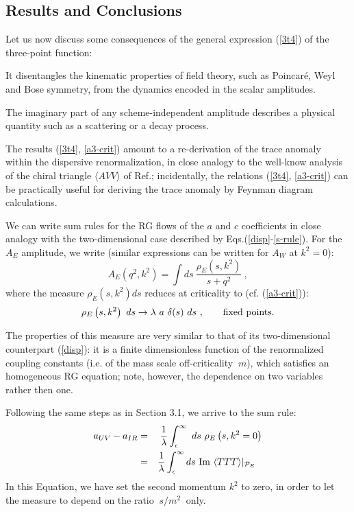 \documentclass[proceedings]{JHEP}
\newcommand{\beq}{\begin{equation}}
\newcommand{\eeq}{\end{equation}}
\newcommand{\bea}{\begin{eqnarray}}
\newcommand{\eea}{\end{eqnarray}}
\def\d{\delta}
\def\eps{\epsilon}
\def\l{\lambda}
\def\r{\rho}
\def\Im{\hbox{\rm Im\ }}
\def\nl{\nonumber\\}
\def\bra{\langle}
\def\ket{\rangle}
\def\TTT{\bra TTT\ket}
\begin{document}

\subsection{Results and Conclusions}

Let us now discuss some consequences 
of the general expression (\ref{3t4}) of the three-point function: 

It disentangles the kinematic properties of field theory, 
such as Poincar\'e, Weyl and Bose symmetry, from the dynamics 
encoded in the scalar amplitudes.

The imaginary part of any scheme-independent amplitude describes a physical 
quantity such as a scattering or a decay process.

The results (\ref{3t4}, \ref{a3-crit}) amount to a re-derivation of the trace
anomaly within the dispersive renormalization, in close analogy to
the well-know analysis of the chiral triangle $\bra AVV\ket$ 
of Ref.\cite{fsby}; incidentally, the relations (\ref{3t4}, \ref{a3-crit})
can be practically useful for deriving the trace anomaly by Feynman diagram
calculations.

We can write sum rules for the RG flows of
the $a$ and $c$ coefficients in close analogy with the two-dimensional 
case described by Eqs.(\ref{disp}-\ref{s-rule}).
For the $A_E$ amplitude, we write (similar expressions can be written for
$A_W$ at $k^2=0$):
\beq
A_E \left( q^2,k^2 \right) = \int ds\ \frac{\r_E(s,k^2)}{s+q^2}
\ ,
\label{disp-e}\eeq
where the measure $\r_E(s,k^2) ds$ reduces at
criticality to (cf. (\ref{a3-crit})):
\beq
\r_E \left(s, k^2 \right)\ ds \to \l\ a\ \d(s)\ ds\ ,
\qquad {\rm fixed\ points}.
\label{r-crit-e}\eeq

The properties of this measure are very similar to that of its two-dimensional 
counterpart (\ref{disp}): it is a finite dimensionless function of the
renormalized coupling constants (i.e. of the mass scale off-criticality $\ m$),
which satisfies an homogeneous RG equation; note, however,
the dependence on two variables rather then one.

Following the same steps as in Section 3.1, we arrive to
the sum rule:
\bea
a_{UV}-a_{IR} &=& \frac{1}{\l}
\int_\eps^\infty\ ds\ \r_E\left(s, k^2=0 \right) \nl
&=& \frac{1}{\l}\int_\eps^\infty ds\ \Im\TTT\vert_{{\cal P}_E}\ \ 
\label{a-rule}\eea
In this Equation, we have set the second momentum $k^2$ to zero,
in order to let the measure to depend on the ratio $\ s/m^2\ $ only. 
\end{document}
